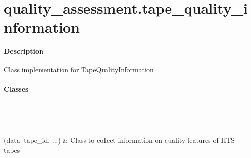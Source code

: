 \documentclass[letterpaper,10pt,english]{sphinxmanual}
\begin{document}
\chapter{quality\_assessment.tape\_quality\_information}
\label{\detokenize{generated/quality_assessment.tape_quality_information:quality-assessment-tape-quality-information}}\label{\detokenize{generated/quality_assessment.tape_quality_information::doc}}\subsubsection*{Description}
\label{\detokenize{generated/quality_assessment.tape_quality_information:module-quality_assessment.tape_quality_information}}
\sphinxAtStartPar
Class implementation for TapeQualityInformation
\subsubsection*{Classes}


\begin{savenotes}\sphinxatlongtablestart\begin{longtable}[c]{}
\hline

\endfirsthead

%
{}\\
\hline

\endhead

\hline
{}\\
\endfoot

\endlastfoot

\sphinxAtStartPar
{\hyperref[\detokenize{generated/quality_assessment.tape_quality_information.TapeQualityInformation:quality_assessment.tape_quality_information.TapeQualityInformation}]{}}(data, tape\_id, ...)
&
\sphinxAtStartPar
Class to collect information on quality features of HTS tapes
\\
\hline
\end{longtable}\sphinxatlongtableend\end{savenotes}
\end{document}
